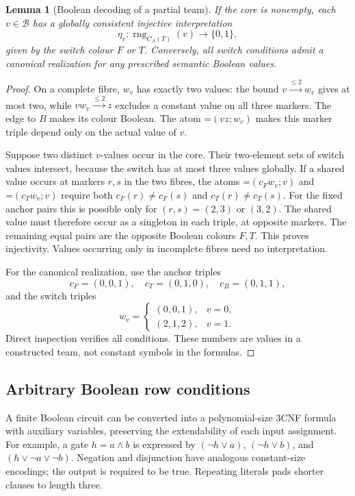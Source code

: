 \documentclass[11pt,a4paper]{article}
\newcommand{\dep}[2]{\mathord{=}(#1;#2)}
\newcommand{\ND}[3]{#1\xrightarrow{\leq #3}#2}
\newtheorem{lemma}[theorem]{Lemma}
\theoremstyle{definition}
\begin{document}
\begin{lemma}[Boolean decoding of a partial team]
\label{lem:decode}
If the core is nonempty, each $v\in\mathcal B$ has a globally
consistent injective interpretation
\[
 \eta_v:\operatorname{rng}_{C_A(T)}(v)\longrightarrow\{0,1\},
\]
given by the switch colour $F$ or $T$. Conversely, all switch
conditions admit a canonical realization for any prescribed semantic
Boolean values.
\end{lemma}
\begin{proof}
On a complete fibre, $w_v$ has exactly two values: the bound
$\ND v{w_v}2$ gives at most two, while $\ND{v w_v}z2$ excludes a
constant value on all three markers. The edge to $B$ makes its colour
Boolean. The atom $\dep{vz}{w_v}$ makes this marker triple depend
only on the actual value of $v$.

Suppose two distinct $v$-values occur in the core. Their two-element
sets of switch values intersect, because the switch has at most three
values globally. If a shared value occurs at markers $r,s$ in the
two fibres, the atoms $\dep{c_Fw_v}v$ and $\dep{c_Tw_v}v$ require
both $c_F(r)\ne c_F(s)$ and $c_T(r)\ne c_T(s)$. For the fixed
anchor pairs this is possible only for $(r,s)=(2,3)$ or $(3,2)$.
The shared value must therefore occur as a singleton in each triple,
at opposite markers. The remaining equal pairs are the opposite
Boolean colours $F,T$. This proves injectivity. Values occurring
only in incomplete fibres need no interpretation.

For the canonical realization, use the anchor triples
\[
 c_F=(0,0,1),\quad c_T=(0,1,0),\quad c_B=(0,1,1),
\]
and the switch triples
\[
 w_v=\begin{cases}(0,0,1),&v=0,\\(2,1,2),&v=1.\end{cases}
\]
Direct inspection verifies all conditions. These numbers are values
in a constructed team, not constant symbols in the formulas.
\end{proof}

\subsection{Arbitrary Boolean row conditions}
A finite Boolean circuit can be converted into a polynomial-size
3CNF formula with auxiliary variables, preserving the extendability
of each input assignment. For example, a gate $h=a\wedge b$ is
expressed by $(\neg h\vee a)$, $(\neg h\vee b)$, and
$(h\vee\neg a\vee\neg b)$. Negation and disjunction have analogous
constant-size encodings; the output is required to be true. Repeating
literals pads shorter clauses to length three.
\end{document}
